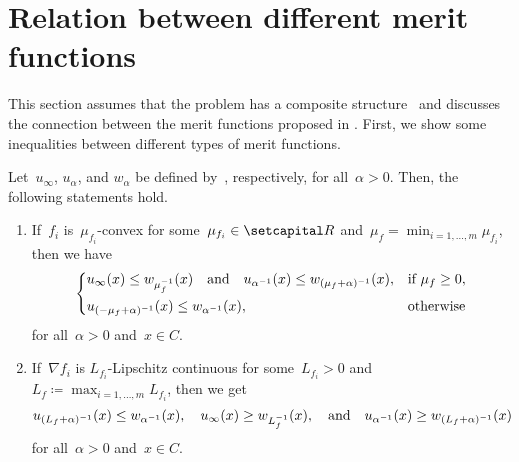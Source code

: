 \documentclass[../main]{subfiles}
\begin{document}
\section{Relation between different merit functions} 
This section assumes that the problem has a composite structure~ and discusses the connection between the merit functions proposed in .
First, we show some inequalities between different types of merit functions.
\begin{theorem} 
    Let~$u_\infty$, $u_\alpha$, and $w_\alpha$ be defined by~, respectively, for all~$\alpha > 0$.
    Then, the following statements hold.
    \begin{enumerate}
        \item If~$f_i$ is~$\mu_{f_i}$-convex for some~$\mu_{f_i} \in \setR$ and~$\mu_f = \min_{i = 1, \dots, m} \mu_{f_i}$, then we have
            \begin{equation}
                \begin{dcases}
                    u_\infty(x) \le w_{\mu_f^{-1}}(x) \quad \text{and} \quad u_{\alpha^{-1}}(x) \le w_{(\mu_f + \alpha)^{-1}}(x), & \text{if } \mu_f \ge 0, \\
                    u_{(- \mu_f + \alpha)^{-1}}(x) \le w_{\alpha^{-1}}(x), & \text{otherwise}
                \end{dcases}
            \end{equation}
            for all~$\alpha > 0$ and~$x \in C$. 

        \item If~$\nabla f_i$ is $L_{f_i}$-Lipschitz continuous for some~$L_{f_i} > 0$ and~$L_f \coloneqq \max_{i = 1, \dots, m} L_{f_i}$, then we get
            \begin{equation}
                u_{(L_f + \alpha)^{-1}}(x) \le w_{\alpha^{-1}}(x), \quad u_\infty(x) \ge w_{L_f^{-1}}(x), \quad \text{and} \quad u_{\alpha^{-1}}(x) \ge w_{(L_f + \alpha)^{-1}}(x)
            \end{equation}
            for all~$\alpha > 0$ and~$x \in C$.
    \end{enumerate}
\end{theorem}
\end{document}
